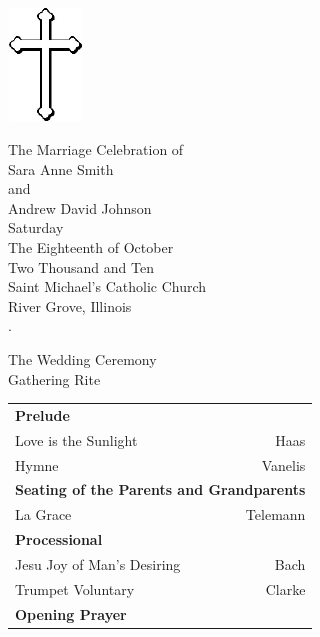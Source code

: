 \documentclass[12pt,letterpaper]{article}
\newcommand{\pageheading}{\sc \Large}
\newcommand{\sectionheading}{\calligra \Large}
\newcommand{\tableheading}{\sc \normalsize \textbf}
\begin{document}
\begin{center}
\begin{center}
\includegraphics[width=20mm,height=30mm]{./catholic_cross.jpg}
\end{center}
\vspace{.5in}
{\sc \Large The Marriage Celebration of}\\
\vspace{.45in}
{\calligra \huge Sara Anne Smith}\\
\medskip
{\sc \large and}\\
\medskip
{\calligra \huge Andrew David Johnson}\\
\vspace{1.75in}
{\sc \large Saturday}\\
{\sc \large The Eighteenth of October}\\
{\sc \large Two Thousand and Ten}\\
\vspace{.2in}
{\sc \large Saint Michael's Catholic Church}\\
{\sc \large River Grove, Illinois}\\
\pagebreak
\tiny{.}
\pagebreak


\pageheading{The Wedding Ceremony} \\
\bigskip
\sectionheading{Gathering Rite} \\
\begin{center}
\begin{tabularx}{4.5in}{l X r}
\tableheading{Prelude} &  &\\
{\sc \footnotesize \hspace{.1in}Love is the Sunlight} &  &  {\sc \footnotesize Haas}\\
{\sc \footnotesize \hspace{.1in}Hymne} &  &  {\sc \footnotesize Vanelis}\\
\multicolumn{3}{l}{\tableheading{Seating of the Parents and Grandparents}} \\
{\sc \footnotesize \hspace{.1in}La Grace} &  &   {\sc \footnotesize Telemann} \\
\tableheading{Processional} &  &\\
{\sc \footnotesize \hspace{.1in}Jesu Joy of Man's Desiring} &  &  {\sc \footnotesize Bach} \\
{\sc \footnotesize \hspace{.1in}Trumpet Voluntary} &  &  {\sc \footnotesize Clarke} \\
\tableheading{Opening Prayer} &  &\\
\end{tabularx}
\vspace{.3in} \\


\end{center}
\end{center}
\end{document}
